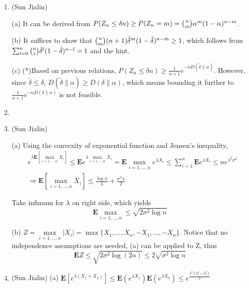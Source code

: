 \begin{enumerate}
	(b) The Hoeffding bound is $ e^{-2n(\alpha-\delta)^{2}} $. So it suffices to prove that $ D(\delta\parallel\alpha) \geq 2(\delta-\alpha)^{2} $.
	
	\item
	(Sun Jialin)
	
	(a) It can be derived from $ P(Z_{n} \leq \delta n) \geq P(Z_{n}=m) = \tbinom{n}{m}\alpha^{m}(1-\alpha)^{n-m} $.
	
	(b) It suffices to show that $ \tbinom{n}{m}(n+1)\tilde{\delta}^{m}(1-\tilde{\delta})^{n-m} \geq 1$, which follows from $ \sum_{l=0}^{n}\tbinom{n}{l}\tilde{\delta}^{l}(1-\tilde{\delta})^{n-l}=1 $ and the hint.
	
	(c) (*)Based on previous relations, $ P(Z_{n}\leq \delta n)\geq \frac{1}{n+1}e^{-nD(\tilde{\delta}\parallel\alpha)} $. However, since $ \tilde{\delta} \leq \delta $, $ D(\tilde{\delta}\parallel\alpha) \geq D(\delta\parallel\alpha) $, which means bounding it further to  $ \frac{1}{n+1}e^{-nD(\delta\parallel\alpha)} $ is not feasible.
	
	\item
	
	\item
	(Sun Jialin)
	
	(a) Using the convexity of exponential function and Jensen's inequality,
	\[\begin{split}
	&e^{\lambda\bm{E}[\max \limits_{i=1,...,n} X_{i}]} \leq 
	\bm{E}e^{\lambda \max \limits_{i=1,...,n} X_{i}} =
	\bm{E}\max \limits_{i=1,...,n} e^{\lambda X_{i}} \leq
	\sum_{i=1}^{n} \bm{E}e^{\lambda X_{i}} \leq
	ne^{\lambda^{2}\sigma^{2}} \\& \Rightarrow
	\bm{E}[\max \limits_{i=1,...,n} X_{i}] \leq \frac{\log n}{\lambda}+ \frac{\sigma^{2}\lambda}{2}
	\end{split} \]
	
	Take infimum for $\lambda$ on right side, which yields 
	\[ \bm{E} \max \limits_{i=1,...,n} \leq \sqrt{2\sigma^{2}\log n} \]
	
	(b) $ Z = \max \limits_{i=1,...,n} |X_{i}| = \max\{X_{1},...,X_{n},-X_{1},...,-X_{n}\} $. Notice that no independence assumptions are needed, (a) can be applied to Z, thus 
	\[ \bm{E}Z\leq \sqrt{2\sigma^{2}\log(2n)} \leq 2\sqrt{\sigma^{2}\log n} \]
	
	\item
	(Sun Jialin)
	(a) $ \bm{E}[e^{\lambda(X_{1}+X_{2})}] \leq \bm{E}(e^{\lambda X_{1}})\bm{E}(e^{\lambda X_{2}})\leq e^{\frac{\lambda^{2}(\sigma^{2}_{1}+\sigma^{2}_{2})}{2}} $
	

\end{enumerate}
